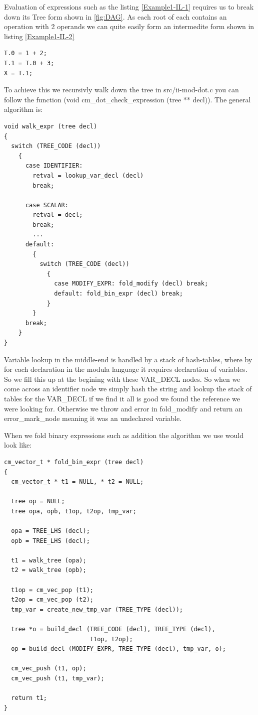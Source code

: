 \documentclass[defaultstyle,11pt]{article}
\begin{document}
Evaluation of expressions such as the listing \ref{Example1-IL-1} requires us to break down its Tree form shown in \ref{fig:DAG}. As
each root of each contains an operation with 2 operands we can quite easily form an intermedite form shown in listing \ref{Example1-IL-2}

\begin{lstlisting}
T.0 = 1 + 2;
T.1 = T.0 + 3;
X = T.1;
\end{lstlisting}

To achieve this we recursivly walk down the tree in src/ii-mod-dot.c you can follow the function (void cm\_dot\_check\_expression (tree ** decl)).
The general algorithm is:

\begin{lstlisting}
void walk_expr (tree decl)
{
  switch (TREE_CODE (decl))
    {
      case IDENTIFIER:
        retval = lookup_var_decl (decl)
        break;

      case SCALAR:
        retval = decl;
        break;
        ...
      default:
        {
          switch (TREE_CODE (decl))
            {
              case MODIFY_EXPR: fold_modify (decl) break;
              default: fold_bin_expr (decl) break;
            }
        }
      break;
    }
}
\end{lstlisting}

Variable lookup in the middle-end is handled by a stack of hash-tables, where by for each declaration in the modula language it
requires declaration of variables. So we fill this up at the begining with these VAR\_DECL nodes. So when we come across an identifier
node we simply hash the string and lookup the stack of tables for the VAR\_DECL if we find it all is good we found the reference we were
looking for. Otherwise we throw and error in fold\_modify and return an error\_mark\_node meaning it was an undeclared variable.

When we fold binary expressions such as addition the algorithm we use would look like:

\begin{lstlisting}
cm_vector_t * fold_bin_expr (tree decl)
{
  cm_vector_t * t1 = NULL, * t2 = NULL;

  tree op = NULL;
  tree opa, opb, t1op, t2op, tmp_var;

  opa = TREE_LHS (decl);
  opb = TREE_LHS (decl);

  t1 = walk_tree (opa);
  t2 = walk_tree (opb);
  
  t1op = cm_vec_pop (t1);
  t2op = cm_vec_pop (t2);
  tmp_var = create_new_tmp_var (TREE_TYPE (decl));

  tree *o = build_decl (TREE_CODE (decl), TREE_TYPE (decl),
                        t1op, t2op);
  op = build_decl (MODIFY_EXPR, TREE_TYPE (decl), tmp_var, o);

  cm_vec_push (t1, op);
  cm_vec_push (t1, tmp_var);

  return t1;
}
\end{lstlisting}
\end{document}

